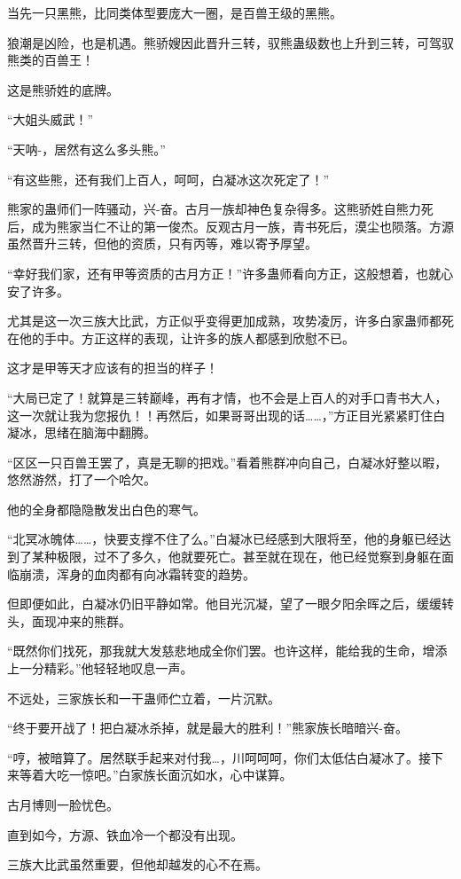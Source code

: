 \begin{this_body}
当先一只黑熊，比同类体型要庞大一圈，是百兽王级的黑熊。

狼潮是凶险，也是机遇。熊骄嫂因此晋升三转，驭熊蛊级数也上升到三转，可驾驭熊类的百兽王！

这是熊骄姓的底牌。

“大姐头威武！”

“天呐-，居然有这么多头熊。”

“有这些熊，还有我们上百人，呵呵，白凝冰这次死定了！”

熊家的蛊师们一阵骚动，兴-奋。古月一族却神色复杂得多。这熊骄姓自熊力死后，成为熊家当仁不让的第一俊杰。反观古月一族，青书死后，漠尘也陨落。方源虽然晋升三转，但他的资质，只有丙等，难以寄予厚望。

“幸好我们家，还有甲等资质的古月方正！”许多蛊师看向方正，这般想着，也就心安了许多。

尤其是这一次三族大比武，方正似乎变得更加成熟，攻势凌厉，许多白家蛊师都死在他的手中。方正这样的表现，让许多的族人都感到欣慰不已。

这才是甲等天才应该有的担当的样子！

“大局已定了！就算是三转巅峰，再有才情，也不会是上百人的对手口青书大人，这一次就让我为您报仇！！再然后，如果哥哥出现的话……，”方正目光紧紧盯住白凝冰，思绪在脑海中翻腾。

“区区一只百兽王罢了，真是无聊的把戏。”看着熊群冲向自己，白凝冰好整以暇，悠然游然，打了一个哈欠。

他的全身都隐隐散发出白色的寒气。

“北冥冰魄体……，快要支撑不住了么。”白凝冰已经感到大限将至，他的身躯已经达到了某种极限，过不了多久，他就要死亡。甚至就在现在，他已经觉察到身躯在面临崩溃，浑身的血肉都有向冰霜转变的趋势。

但即便如此，白凝冰仍旧平静如常。他目光沉凝，望了一眼夕阳余晖之后，缓缓转头，面现冲来的熊群。

“既然你们找死，那我就大发慈悲地成全你们罢。也许这样，能给我的生命，增添上一分精彩。”他轻轻地叹息一声。

不远处，三家族长和一干蛊师伫立着，一片沉默。

“终于要开战了！把白凝冰杀掉，就是最大的胜利！”熊家族长暗暗兴-奋。

“哼，被暗算了。居然联手起来对付我…，川呵呵呵，你们太低估白凝冰了。接下来等着大吃一惊吧。”白家族长面沉如水，心中谋算。

古月博则一脸忧色。

直到如今，方源、铁血冷一个都没有出现。

三族大比武虽然重要，但他却越发的心不在焉。


\end{this_body}

